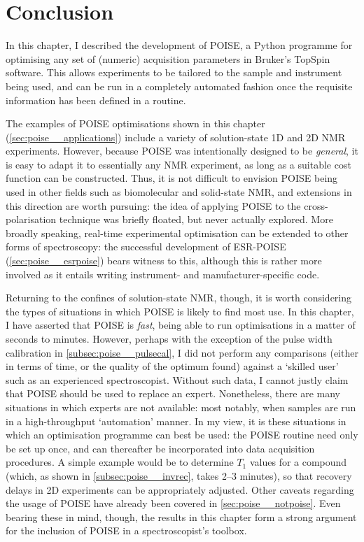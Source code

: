 \section{Conclusion}
\label{sec:poise__conclusion}

In this chapter, I described the development of POISE, a Python programme for optimising any set of (numeric) acquisition parameters in Bruker's TopSpin software.
This allows experiments to be tailored to the sample and instrument being used, and can be run in a completely automated fashion once the requisite information has been defined in a routine.

The examples of POISE optimisations shown in this chapter (\cref{sec:poise__applications}) include a variety of solution-state 1D and 2D NMR experiments.
However, because POISE was intentionally designed to be \textit{general}, it is easy to adapt it to essentially any NMR experiment, as long as a suitable cost function can be constructed.
Thus, it is not difficult to envision POISE being used in other fields such as biomolecular and solid-state NMR, and extensions in this direction are worth pursuing: the idea of applying POISE to the cross-polarisation technique\autocite{Pines1972JCP} was briefly floated, but never actually explored.
More broadly speaking, real-time experimental optimisation can be extended to other forms of spectroscopy: the successful development of ESR-POISE (\cref{sec:poise__esrpoise}) bears witness to this, although this is rather more involved as it entails writing instrument- and manufacturer-specific code.

Returning to the confines of solution-state NMR, though, it is worth considering the types of situations in which POISE is likely to find most use.
In this chapter, I have asserted that POISE is \textit{fast}, being able to run optimisations in a matter of seconds to minutes.
However, perhaps with the exception of the pulse width calibration in \cref{subsec:poise__pulsecal}, I did not perform any comparisons (either in terms of time, or the quality of the optimum found) against a `skilled user' such as an experienced spectroscopist.
Without such data, I cannot justly claim that POISE should be used to replace an expert.
Nonetheless, there are many situations in which experts are not available: most notably, when samples are run in a high-throughput `automation' manner.
In my view, it is these situations in which an optimisation programme can best be used: the POISE routine need only be set up once, and can thereafter be incorporated into data acquisition procedures.
A simple example would be to determine $T_1$ values for a compound (which, as shown in \cref{subsec:poise__invrec}, takes 2--3 minutes), so that recovery delays in 2D experiments can be appropriately adjusted.
Other caveats regarding the usage of POISE have already been covered in \cref{sec:poise__notpoise}.
Even bearing these in mind, though, the results in this chapter form a strong argument for the inclusion of POISE in a spectroscopist's toolbox.
